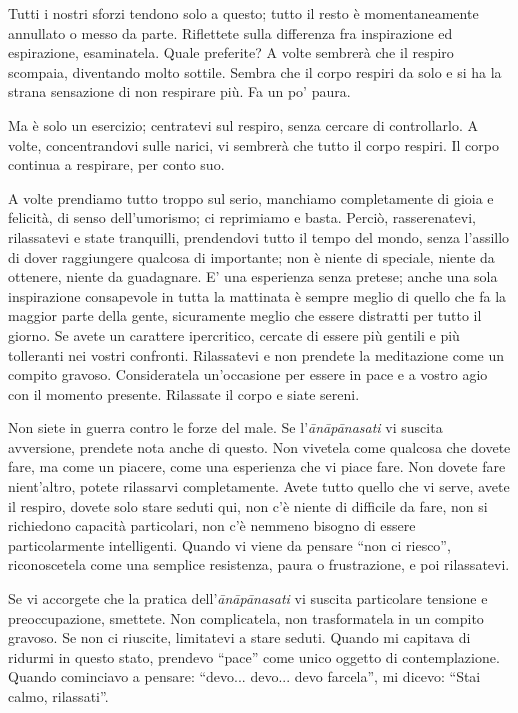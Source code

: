 Tutti i nostri sforzi tendono solo a questo; tutto il resto è
momentaneamente annullato o messo da parte. Riflettete sulla differenza
fra inspirazione ed espirazione, esaminatela. Quale preferite? A volte
sembrerà che il respiro scompaia, diventando molto sottile. Sembra che
il corpo respiri da solo e si ha la strana sensazione di non respirare
più. Fa un po' paura.

Ma è solo un esercizio; centratevi sul respiro, senza cercare di
controllarlo. A volte, concentrandovi sulle narici, vi sembrerà che
tutto il corpo respiri. Il corpo continua a respirare, per conto suo.

A volte prendiamo tutto troppo sul serio, manchiamo completamente di
gioia e felicità, di senso dell'umorismo; ci reprimiamo e basta. Perciò,
rasserenatevi, rilassatevi e state tranquilli, prendendovi tutto il
tempo del mondo, senza l'assillo di dover raggiungere qualcosa di
importante; non è niente di speciale, niente da ottenere, niente da
guadagnare. E' una esperienza senza pretese; anche una sola inspirazione
consapevole in tutta la mattinata è sempre meglio di quello che fa la
maggior parte della gente, sicuramente meglio che essere distratti per
tutto il giorno. Se avete un carattere ipercritico, cercate di essere
più gentili e più tolleranti nei vostri confronti. Rilassatevi e non
prendete la meditazione come un compito gravoso. Consideratela
un'occasione per essere in pace e a vostro agio con il momento presente.
Rilassate il corpo e siate sereni.

Non siete in guerra contro le forze del male. Se l'\textit{ānāpānasati} vi
suscita avversione, prendete nota anche di questo. Non vivetela come
qualcosa che dovete fare, ma come un piacere, come una esperienza che vi
piace fare. Non dovete fare nient'altro, potete rilassarvi
completamente. Avete tutto quello che vi serve, avete il respiro, dovete
solo stare seduti qui, non c'è niente di difficile da fare, non si
richiedono capacità particolari, non c'è nemmeno bisogno di essere
particolarmente intelligenti. Quando vi viene da pensare ``non ci
riesco'', riconoscetela come una semplice resistenza, paura o
frustrazione, e poi rilassatevi.

Se vi accorgete che la pratica dell'\textit{ānāpānasati} vi suscita particolare
tensione e preoccupazione, smettete. Non complicatela, non trasformatela
in un compito gravoso. Se non ci riuscite, limitatevi a stare seduti.
Quando mi capitava di ridurmi in questo stato, prendevo ``pace'' come
unico oggetto di contemplazione. Quando cominciavo a pensare: ``devo...
devo... devo farcela'', mi dicevo: ``Stai calmo, rilassati''.

